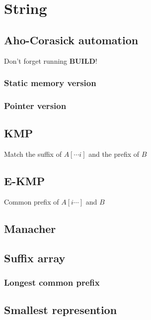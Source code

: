 \section{String}
\subsection{Aho-Corasick automation}
Don't forget running \textbf{BUILD}!
\subsubsection{Static memory version}

\subsubsection{Pointer version}


\subsection{KMP}
Match the suffix of $A[\cdots i]$ and the prefix of $B$


\subsection{E-KMP}
Common prefix of $A[i\cdots]$ and $B$


\subsection{Manacher}


\subsection{Suffix array}

\subsubsection{Longest common prefix}


\subsection{Smallest represention}

